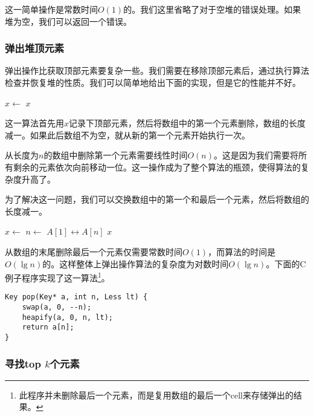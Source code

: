 \documentclass[UTF8]{article}
\begin{document}
这一简单操作是常数时间$O(1)$的。我们这里省略了对于空堆的错误处理。如果堆为空，我们可以返回一个错误。

\subsubsection{弹出堆顶元素}

弹出操作比获取顶部元素要复杂一些。我们需要在移除顶部元素后，通过执行算法检查并恢复堆的性质。我们可以简单地给出下面的实现，但是它的性能并不好。

\begin{algorithmic}[1]
  \State $x \gets$ 
  \State {}
    \State {}
  \EndIf
  \State \Return $x$
\EndFunction
\end{algorithmic}

这一算法首先用$x$记录下顶部元素，然后将数组中的第一个元素删除，数组的长度减一。如果此后数组不为空，就从新的第一个元素开始执行一次。

从长度为$n$的数组中删除第一个元素需要线性时间$O(n)$。这是因为我们需要将所有剩余的元素依次向前移动一位。这一操作成为了整个算法的瓶颈，使得算法的复杂度升高了。

为了解决这一问题，我们可以交换数组中的第一个和最后一个元素，然后将数组的长度减一。

\begin{algorithmic}[1]
  \State $x \gets$ 
  \State $n \gets$ 
  \State {} $A[1] \leftrightarrow A[n]$
  \State {}
    \State {}
  \EndIf
  \State \Return $x$
\EndFunction
\end{algorithmic}

从数组的末尾删除最后一个元素仅需要常数时间$O(1)$，而算法的时间是$O(\lg n)$的。这样整体上弹出操作算法的复杂度为对数时间$O(\lg n)$。下面的C例子程序实现了这一算法\footnote{此程序并未删除最后一个元素，而是复用数组的最后一个cell来存储弹出的结果。}。

\lstset{language=C}
\begin{lstlisting}
Key pop(Key* a, int n, Less lt) {
    swap(a, 0, --n);
    heapify(a, 0, n, lt);
    return a[n];
}
\end{lstlisting}

\subsubsection{寻找top $k$个元素}
\end{document}
